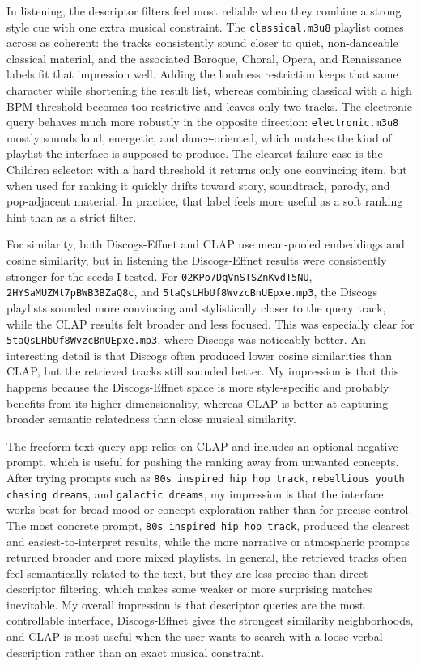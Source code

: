 \documentclass[11pt,a4paper]{article}
\newcommand{\code}[1]{\texttt{#1}}
\begin{document}
In listening, the descriptor filters feel most reliable when they combine a strong style cue with one extra musical constraint. The \code{classical.m3u8} playlist comes across as coherent: the tracks consistently sound closer to quiet, non-danceable classical material, and the associated Baroque, Choral, Opera, and Renaissance labels fit that impression well. Adding the loudness restriction keeps that same character while shortening the result list, whereas combining classical with a high BPM threshold becomes too restrictive and leaves only two tracks. The electronic query behaves much more robustly in the opposite direction: \code{electronic.m3u8} mostly sounds loud, energetic, and dance-oriented, which matches the kind of playlist the interface is supposed to produce. The clearest failure case is the Children selector: with a hard threshold it returns only one convincing item, but when used for ranking it quickly drifts toward story, soundtrack, parody, and pop-adjacent material. In practice, that label feels more useful as a soft ranking hint than as a strict filter.

For similarity, both Discogs-Effnet and CLAP use mean-pooled embeddings and cosine similarity, but in listening the Discogs-Effnet results were consistently stronger for the seeds I tested. For \code{02KPo7DqVnSTSZnKvdT5NU}, \code{2HYSaMUZMt7pBWB3BZaQ8c}, and \code{5taQsLHbUf8WvzcBnUEpxe.mp3}, the Discogs playlists sounded more convincing and stylistically closer to the query track, while the CLAP results felt broader and less focused. This was especially clear for \code{5taQsLHbUf8WvzcBnUEpxe.mp3}, where Discogs was noticeably better. An interesting detail is that Discogs often produced lower cosine similarities than CLAP, but the retrieved tracks still sounded better. My impression is that this happens because the Discogs-Effnet space is more style-specific and probably benefits from its higher dimensionality, whereas CLAP is better at capturing broader semantic relatedness than close musical similarity.

The freeform text-query app relies on CLAP and includes an optional negative prompt, which is useful for pushing the ranking away from unwanted concepts. After trying prompts such as \code{80s inspired hip hop track}, \code{rebellious youth chasing dreams}, and \code{galactic dreams}, my impression is that the interface works best for broad mood or concept exploration rather than for precise control. The most concrete prompt, \code{80s inspired hip hop track}, produced the clearest and easiest-to-interpret results, while the more narrative or atmospheric prompts returned broader and more mixed playlists. In general, the retrieved tracks often feel semantically related to the text, but they are less precise than direct descriptor filtering, which makes some weaker or more surprising matches inevitable. My overall impression is that descriptor queries are the most controllable interface, Discogs-Effnet gives the strongest similarity neighborhoods, and CLAP is most useful when the user wants to search with a loose verbal description rather than an exact musical constraint.
\end{document}
